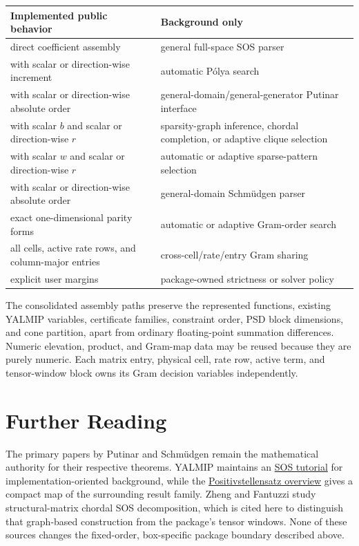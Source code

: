 \begin{tabularx}{\textwidth}{@{}>{\raggedright\arraybackslash}p{}Y@{}}
\toprule
Implemented public behavior & Background only \\
\midrule
direct coefficient assembly & general full-space SOS parser \\
 with scalar or direction-wise increment & automatic P\'olya search \\
 with scalar or direction-wise absolute order & general-domain/general-generator Putinar interface \\
 with scalar $b$ and scalar or direction-wise $r$ & sparsity-graph inference, chordal completion, or adaptive clique selection \\
 with scalar $w$ and scalar or direction-wise $r$ & automatic or adaptive sparse-pattern selection \\
 with scalar or direction-wise absolute order & general-domain Schm\"udgen parser \\
exact one-dimensional parity forms & automatic or adaptive Gram-order search \\
all cells, active rate rows, and column-major entries & cross-cell/rate/entry Gram sharing \\
explicit user margins & package-owned strictness or solver policy \\
\bottomrule
\end{tabularx}

The consolidated assembly paths preserve the represented functions, existing YALMIP variables, certificate families, constraint order, PSD block dimensions, and cone partition, apart from ordinary floating-point summation differences. Numeric elevation, product, and Gram-map data may be reused because they are purely numeric. Each matrix entry, physical cell, rate row, active term, and tensor-window block owns its Gram decision variables independently.

\section{Further Reading}
The primary papers by Putinar \cite{putinar1993} and Schm\"udgen \cite{schmudgen1991} remain the mathematical authority for their respective theorems. YALMIP maintains an \href{https://yalmip.github.io/tutorial/sumofsquaresprogramming/}{SOS tutorial} for implementation-oriented background, while the \href{https://en.wikipedia.org/wiki/Positivstellensatz}{Positivstellensatz overview} gives a compact map of the surrounding result family. Zheng and Fantuzzi \cite{zhengfantuzzi2023} study structural-matrix chordal SOS decomposition, which is cited here to distinguish that graph-based construction from the package's tensor windows. None of these sources changes the fixed-order, box-specific package boundary described above.
